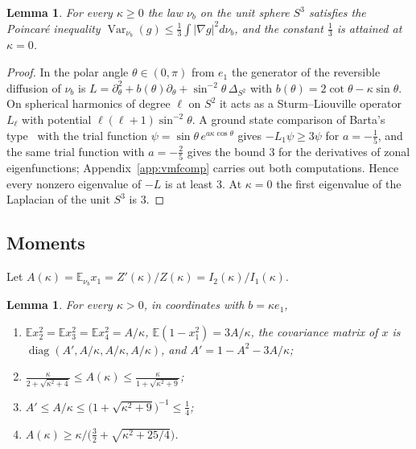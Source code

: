 \documentclass[aps,prd,twocolumn,superscriptaddress,nofootinbib,longbibliography,floatfix,amsmath,amssymb,10pt]{revtex4-2}
\newtheorem{lemma}[theorem]{Lemma}
\theoremstyle{definition}
\theoremstyle{remark}
\newcommand{\E}{\mathbb{E}}
\newcommand{\Var}{\operatorname{Var}}
\begin{document}
\begin{lemma}\label{q-lem:vmf}
For every $\kappa\ge0$ the law $\nu_b$ on the unit sphere $S^3$ satisfies
the Poincar\'e inequality $\Var_{\nu_b}(g)\le\frac13\int|\nabla g|^2d\nu_b$,
and the constant $\frac13$ is attained at $\kappa=0$.
\end{lemma}

\begin{proof}
In the polar angle $\theta\in(0,\pi)$ from $e_1$ the generator of the
reversible diffusion of $\nu_b$ is $L=\partial_\theta^2+b(\theta)
\partial_\theta+\sin^{-2}\theta\,\Delta_{S^2}$ with $b(\theta)=2\cot\theta-
\kappa\sin\theta$. On spherical harmonics of degree $\ell$ on $S^2$ it acts as
a Sturm--Liouville operator $L_\ell$ with potential
$\ell(\ell+1)\sin^{-2}\theta$. A ground state comparison of Barta's
type~\cite{Bar37} with the trial function $\psi=\sin\theta\,
e^{a\kappa\cos\theta}$ gives $-L_1\psi\ge3\psi$ for $a=-\frac15$, and the same
trial function with $a=-\frac25$ gives the bound $3$ for the derivatives of
zonal eigenfunctions; Appendix~\ref{app:vmfcomp} carries out both computations.
Hence every nonzero eigenvalue of $-L$ is at least $3$. At $\kappa=0$ the
first eigenvalue of the Laplacian of the unit $S^3$ is $3$.
\end{proof}

\subsection{Moments}

Let $A(\kappa)=\E_{\nu_b}x_1=Z'(\kappa)/Z(\kappa)=I_2(\kappa)/I_1(\kappa)$.

\begin{lemma}\label{q-lem:moments}
For every $\kappa>0$, in coordinates with $b=\kappa e_1$,
\begin{enumerate}[label=\textup{(\roman*)},leftmargin=*]
\item $\E x_2^2=\E x_3^2=\E x_4^2=A/\kappa$, $\E(1-x_1^2)=3A/\kappa$, the
covariance matrix of $x$ is $\operatorname{diag}(A',A/\kappa,A/\kappa,
A/\kappa)$, and $A'=1-A^2-3A/\kappa$;
\item $\displaystyle\frac{\kappa}{2+\sqrt{\kappa^2+4}}\le
A(\kappa)\le\frac{\kappa}{1+\sqrt{\kappa^2+9}}$;
\item $A'\le A/\kappa\le\bigl(1+\sqrt{\kappa^2+9}\bigr)^{-1}\le\frac14$;
\item $A(\kappa)\ge\kappa\big/\bigl(\frac32+\sqrt{\kappa^2+25/4}\bigr)$.
\end{enumerate}
\end{lemma}
\end{document}
